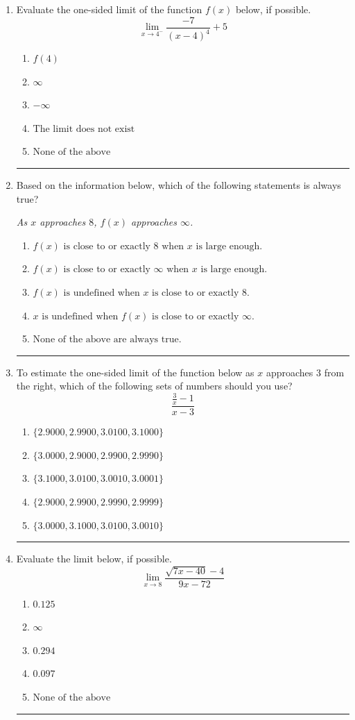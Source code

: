 \documentclass[14pt]{extbook}
\newcommand{\litem}[1]{\item#1\hspace*{-1cm}\rule{\textwidth}{0.4pt}}
\begin{document}
\begin{enumerate}
{\begin{enumerate}[label=\Alph*.]
\end{enumerate} }
\litem{
Evaluate the one-sided limit of the function $f(x)$ below, if possible.\[ \lim_{x \rightarrow 4^-} \frac{-7}{(x-4)^4}+5 \]\begin{enumerate}[label=\Alph*.]
\item \( f(4) \)
\item \( \infty \)
\item \( -\infty \)
\item \( \text{The limit does not exist} \)
\item \( \text{None of the above} \)

\end{enumerate} }
\litem{
Based on the information below, which of the following statements is always true?
\begin{center}
    \textit{ As $x$ approaches $8$, $f(x)$ approaches $\infty$. }
\end{center}
\begin{enumerate}[label=\Alph*.]
\item \( f(x) \text{ is close to or exactly } 8 \text{ when } x \text{ is large enough}. \)
\item \( f(x) \text{ is close to or exactly } \infty \text{ when } x \text{ is large enough}. \)
\item \( f(x) \text{ is undefined when } x \text{ is close to or exactly } 8. \)
\item \( x \text{ is undefined when } f(x) \text{ is close to or exactly } \infty. \)
\item \( \text{None of the above are always true.} \)

\end{enumerate} }
\litem{
To estimate the one-sided limit of the function below as $x$ approaches 3 from the right, which of the following sets of numbers should you use?\[ \frac{\frac{3}{x} - 1}{x - 3} \]\begin{enumerate}[label=\Alph*.]
\item \( \{ 2.9000, 2.9900, 3.0100, 3.1000 \} \)
\item \( \{ 3.0000, 2.9000, 2.9900, 2.9990 \} \)
\item \( \{ 3.1000, 3.0100, 3.0010, 3.0001 \} \)
\item \( \{ 2.9000, 2.9900, 2.9990, 2.9999 \} \)
\item \( \{ 3.0000, 3.1000, 3.0100, 3.0010 \} \)

\end{enumerate} }
\litem{
Evaluate the limit below, if possible.\[ \lim_{x \rightarrow 8} \frac{\sqrt{7x - 40} - 4}{9x - 72} \]\begin{enumerate}[label=\Alph*.]
\item \( 0.125 \)
\item \( \infty \)
\item \( 0.294 \)
\item \( 0.097 \)
\item \( \text{None of the above} \)

\end{enumerate} }
\end{enumerate}
\end{document}

